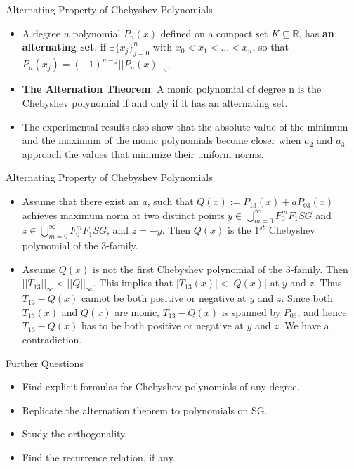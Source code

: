 \documentclass[xcolor = dvipsnames]{beamer}
\begin{document}
\begin{frame}{Alternating Property of Chebyshev Polynomials}
    \begin{itemize}
        \item A degree $n$ polynomial $P_{n}(x)$ defined on a compact set $K \subseteq \mathbb{R}$, has \textbf{an alternating set}, if $\exists \{x_{j}\}_{j=0}^n$ with $x_{0} < x_{1} < ...< x_{n}$, so that $P_{n}(x_{j}) = (-1)^{n-j}||P_{n}(x)||_{u}$.
        \item \textbf{The Alternation Theorem}: A monic polynomial of degree n is the Chebyshev polynomial if and only if it has an alternating set.
        \item The experimental results also show that the absolute value of the minimum and the maximum of the monic polynomials become closer when $a_{2}$ and $a_{3}$ approach the values that minimize their uniform norms.
    \end{itemize}
\end{frame}

\begin{frame}{Alternating Property of Chebyshev Polynomials}
    \begin{itemize}
        \item Assume that there exist an $a$, such that $Q(x) := P_{13}(x)+aP_{03}(x)$ achieves maximum norm at two distinct points $y \in \bigcup\limits_{m=0}^{\infty} F_{0}^{m}F_{1}SG$ and $z \in \bigcup\limits_{m=0}^{\infty} F_{0}^{m}F_{1}SG$, and $z = -y$. Then $Q(x)$ is the $1^{st}$ Chebyshev polynomial of the 3-family.
    
        \item Assume $Q(x)$ is not the first Chebyshev polynomial of the 3-family. Then $||T_{13}||_{\infty} < ||Q||_{\infty}$. This implies that $|T_{13}(x)| < |Q(x)|$ at $y$ and $z$. Thus $T_{13} - Q(x)$ cannot be both positive or negative at $y$ and $z$. Since both $T_{13}(x)$ and $Q(x)$ are monic, $T_{13} - Q(x)$ is spanned by $P_{03}$, and hence $T_{13} - Q(x)$ has to be both positive or negative at $y$ and $z$. We have a contradiction.
    \end{itemize}
\end{frame}

\begin{frame}{Further Questions}
    \begin{itemize}
        \item Find explicit formulas for Chebyshev polynomials of any degree.
        \item Replicate the alternation theorem to polynomials on SG.
        \item Study the orthogonality.
        \item Find the recurrence relation, if any.
    \end{itemize}
\end{frame}
\end{document}
